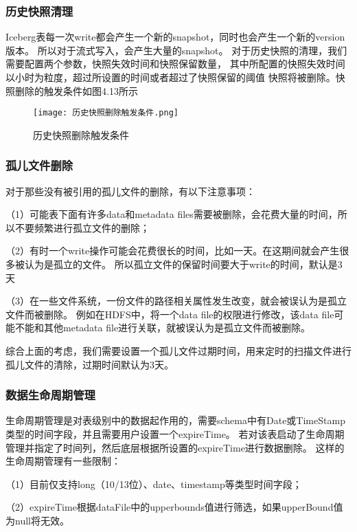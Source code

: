 \subsubsection{历史快照清理}

Iceberg表每一次write都会产生一个新的snapshot，同时也会产生一个新的version版本。
所以对于流式写入，会产生大量的snapshot。
对于历史快照的清理，我们需要配置两个参数，快照失效时间和快照保留数量，
其中所配置的快照失效时间以小时为粒度，超过所设置的时间或者超过了快照保留的阈值
快照将被删除。快照删除的触发条件如图4.13所示

\begin{figure}[h]
  \centering
  \texttt{[image: 历史快照删除触发条件.png]}
  \caption{历史快照删除触发条件}
  \label{fig:badge}
\end{figure}

\subsubsection{孤儿文件删除}

对于那些没有被引用的孤儿文件的删除，有以下注意事项：

（1）可能表下面有许多data和metadata files需要被删除，会花费大量的时间，所以不要频繁进行孤立文件的删除；

（2）有时一个write操作可能会花费很长的时间，比如一天。在这期间就会产生很多被认为是孤立的文件。
所以孤立文件的保留时间要大于write的时间，默认是3天

（3）在一些文件系统，一份文件的路径相关属性发生改变，就会被误认为是孤立文件而被删除。
例如在HDFS中，将一个data file的权限进行修改，该data file可能不能和其他metadata file进行关联，就被误认为是孤立文件而被删除。

综合上面的考虑，我们需要设置一个孤儿文件过期时间，用来定时的扫描文件进行孤儿文件的清除，过期时间默认为3天。

\subsubsection{数据生命周期管理}

⽣命周期管理是对表级别中的数据起作用的，需要schema中有Date或TimeStamp类型的时间字段，并且需要用户设置一个expireTime。
若对该表启动了⽣命周期管理并指定了时间列，然后底层根据所设置的expireTime进⾏数据删除。
这样的⽣命周期管理有一些限制：

（1）⽬前仅⽀持long（10/13位）、date、timestamp等类型时间字段；

（2）expireTime根据dataFile中的upperbounds值进⾏筛选，如果upperBound值为null将⽆效。

